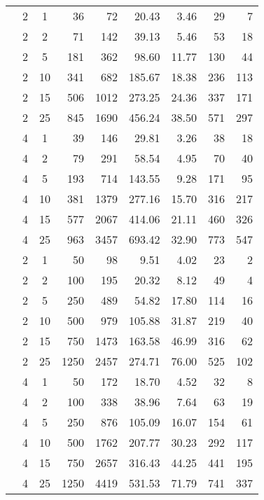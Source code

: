 \documentclass[12pt,a4paper]{article}
\begin{document}
\begin{table}
\begin{center}
\begin{tabular}{cccrrrrrr}
&  2 & 1 &  36 &  72  & 20.43 & 3.46 &  29 &   7 \\ 
&  2 & 2 &  71 & 142  & 39.13 & 5.46 &  53 &  18 \\ 
&  2 & 5 & 181 & 362  & 98.60 & 11.77 & 130 &  44 \\ 
& 2 & 10 & 341 & 682  & 185.67 & 18.38 & 236 & 113 \\ 
&  2 & 15 & 506 & 1012  & 273.25 & 24.36 & 337 & 171 \\ 
&  2 & 25 & 845 & 1690  & 456.24 & 38.50 & 571 & 297 \\ \rowcolor[gray]{0.85}
\cellcolor{white}&  4 & 1 &  39 & 146  & 29.81 & 3.26 &  38 &  18 \\ \rowcolor[gray]{0.85}
\cellcolor{white}&  4 & 2 &  79 & 291  & 58.54 & 4.95 &  70 &  40 \\ \rowcolor[gray]{0.85}
\cellcolor{white}&  4 & 5 & 193 & 714  & 143.55 & 9.28 & 171 &  95 \\ \rowcolor[gray]{0.85}
\cellcolor{white}&  4 & 10 & 381 & 1379  & 277.16 & 15.70 & 316 & 217 \\ \rowcolor[gray]{0.85}
\cellcolor{white}&  4 & 15 & 577 & 2067  & 414.06 & 21.11 & 460 & 326 \\ \rowcolor[gray]{0.85}
\cellcolor{white}\multirow{-12}{*}{\begin{sideways}\textbf{\large equal frequency}\end{sideways}} 
&  4 & 25 & 963 & 3457  & 693.42 & 32.90 & 773 & 547 \\  \hline
&  2 & 1 &  50 &  98  & 9.51 & 4.02 &  23 &   2 \\ 
&  2 & 2 & 100 & 195  & 20.32 & 8.12 &  49 &   4 \\ 
&  2 & 5 & 250 & 489  & 54.82 & 17.80 & 114 &  16 \\ 
& 2 & 10 & 500 & 979  & 105.88 & 31.87 & 219 &  40 \\ 
&  2 & 15 & 750 & 1473  & 163.58 & 46.99 & 316 &  62 \\ 
&  2 & 25 & 1250 & 2457  & 274.71 & 76.00 & 525 & 102 \\ \rowcolor[gray]{0.85}
\cellcolor{white}&  4 & 1 &  50 & 172  & 18.70 & 4.52 &  32 &   8 \\\rowcolor[gray]{0.85}
\cellcolor{white}&  4 & 2 & 100 & 338  & 38.96 & 7.64 &  63 &  19 \\ \rowcolor[gray]{0.85}
\cellcolor{white}&  4 & 5 & 250 & 876  & 105.09 & 16.07 & 154 &  61 \\ \rowcolor[gray]{0.85}
\cellcolor{white}&  4 & 10 & 500 & 1762  & 207.77 & 30.23 & 292 & 117 \\ \rowcolor[gray]{0.85}
\cellcolor{white}&  4 & 15 & 750 & 2657  & 316.43 & 44.25 & 441 & 195 \\ \rowcolor[gray]{0.85}
\cellcolor{white}\multirow{-12}{*}{\begin{sideways}\textbf{\large equal width}\end{sideways}}  
&  4 & 25 & 1250 & 4419  & 531.53 & 71.79 & 741 & 337 \\ \hline
\end{tabular}
\end{center}
\end{table}
\end{document}
